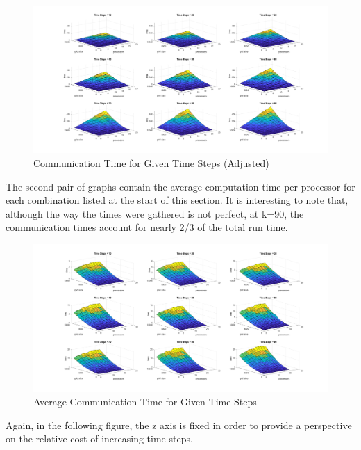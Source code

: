 \documentclass[a4paper, 11pt]{article}
\begin{document}
\begin{figure}[H]
	\centering
	\centerline{\includegraphics[width=7.5in]{comm_time_scaled.png}}
	\caption{Communication Time for Given Time Steps (Adjusted)}
\end{figure}

The second pair of graphs contain the average computation time per processor for each combination listed at the start of this section. It is interesting to note that, although the way the times were gathered is not perfect, at k=90, the communication times account for nearly 2/3 of the total run time.

\begin{figure}[H]
	\centering
	\centerline{\includegraphics[width=7.5in]{comm_time_avg.png}}
	\caption{Average Communication Time for Given Time Steps}
\end{figure}

Again, in the following figure, the z axis is fixed in order to provide a perspective on the relative cost of increasing time steps.
\end{document}
